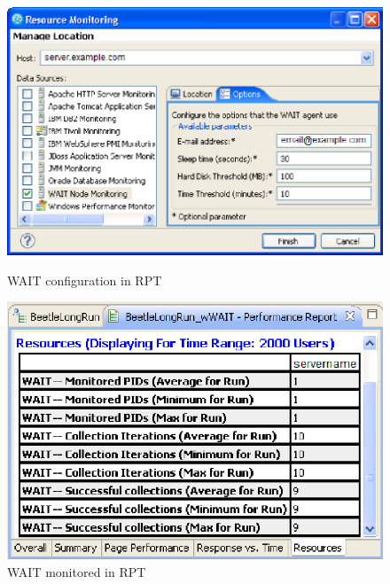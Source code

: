 \documentclass[runningheads,a4paper]{llncs}
\begin{document}
\vspace{-5pt}
\begin{figure}
\centering
\begin{minipage}[b]{.50\textwidth}

\centering
\includegraphics[totalheight=.27\textheight,width=1.0\textwidth]{WAIT-config}
\caption{WAIT configuration in RPT}
\label{fig_config}

\end{minipage}\qquad
\begin{minipage}[b]{.44\textwidth}

\centering
\includegraphics[totalheight=.27\textheight,width=1.0\textwidth]{WAIT-monitoring}
\caption{WAIT monitored in RPT}
\label{fig_mon}

\end{minipage}
\end{figure}
\vspace{-5pt}
\end{document}
